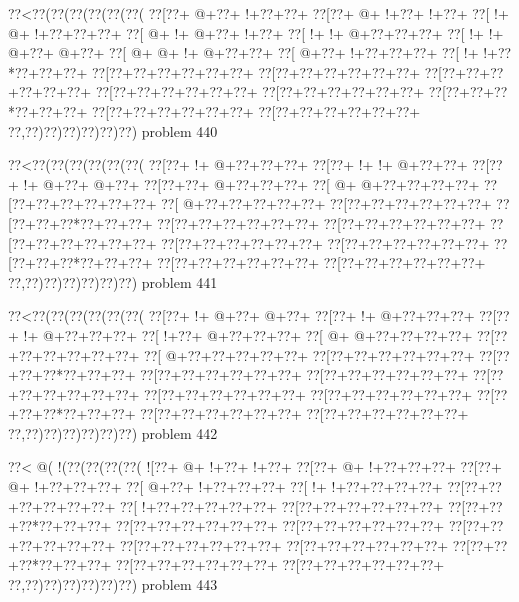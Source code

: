 \vbox{\vbox{\goo
\0??<\0??(\0??(\0??(\0??(\0??(\0??(
\0??[\0??+\- @+\0??+\- !+\0??+\0??+
\0??[\0??+\- @+\- !+\0??+\- !+\0??+
\0??[\- !+\- @+\- !+\0??+\0??+\0??+
\0??[\- @+\- !+\- @+\0??+\- !+\0??+
\0??[\- !+\- !+\- @+\0??+\0??+\0??+
\0??[\- !+\- !+\- @+\0??+\- @+\0??+
\0??[\- @+\- @+\- !+\- @+\0??+\0??+
\0??[\- @+\0??+\- !+\0??+\0??+\0??+
\0??[\- !+\- !+\0??*\0??+\0??+\0??+
\0??[\0??+\0??+\0??+\0??+\0??+\0??+
\0??[\0??+\0??+\0??+\0??+\0??+\0??+
\0??[\0??+\0??+\0??+\0??+\0??+\0??+
\0??[\0??+\0??+\0??+\0??+\0??+\0??+
\0??[\0??+\0??+\0??+\0??+\0??+\0??+
\0??[\0??+\0??+\0??*\0??+\0??+\0??+
\0??[\0??+\0??+\0??+\0??+\0??+\0??+
\0??[\0??+\0??+\0??+\0??+\0??+\0??+
\0??,\0??)\0??)\0??)\0??)\0??)\0??)
}
\hfil problem 440\hfil\break
}

\vbox{\vbox{\goo
\0??<\0??(\0??(\0??(\0??(\0??(\0??(
\0??[\0??+\- !+\- @+\0??+\0??+\0??+
\0??[\0??+\- !+\- !+\- @+\0??+\0??+
\0??[\0??+\- !+\- @+\0??+\- @+\0??+
\0??[\0??+\0??+\- @+\0??+\0??+\0??+
\0??[\- @+\- @+\0??+\0??+\0??+\0??+
\0??[\0??+\0??+\0??+\0??+\0??+\0??+
\0??[\- @+\0??+\0??+\0??+\0??+\0??+
\0??[\0??+\0??+\0??+\0??+\0??+\0??+
\0??[\0??+\0??+\0??*\0??+\0??+\0??+
\0??[\0??+\0??+\0??+\0??+\0??+\0??+
\0??[\0??+\0??+\0??+\0??+\0??+\0??+
\0??[\0??+\0??+\0??+\0??+\0??+\0??+
\0??[\0??+\0??+\0??+\0??+\0??+\0??+
\0??[\0??+\0??+\0??+\0??+\0??+\0??+
\0??[\0??+\0??+\0??*\0??+\0??+\0??+
\0??[\0??+\0??+\0??+\0??+\0??+\0??+
\0??[\0??+\0??+\0??+\0??+\0??+\0??+
\0??,\0??)\0??)\0??)\0??)\0??)\0??)
}
\hfil problem 441\hfil\break
}

\vbox{\vbox{\goo
\0??<\0??(\0??(\0??(\0??(\0??(\0??(
\0??[\0??+\- !+\- @+\0??+\- @+\0??+
\0??[\0??+\- !+\- @+\0??+\0??+\0??+
\0??[\0??+\- !+\- @+\0??+\0??+\0??+
\0??[\- !+\0??+\- @+\0??+\0??+\0??+
\0??[\- @+\- @+\0??+\0??+\0??+\0??+
\0??[\0??+\0??+\0??+\0??+\0??+\0??+
\0??[\- @+\0??+\0??+\0??+\0??+\0??+
\0??[\0??+\0??+\0??+\0??+\0??+\0??+
\0??[\0??+\0??+\0??*\0??+\0??+\0??+
\0??[\0??+\0??+\0??+\0??+\0??+\0??+
\0??[\0??+\0??+\0??+\0??+\0??+\0??+
\0??[\0??+\0??+\0??+\0??+\0??+\0??+
\0??[\0??+\0??+\0??+\0??+\0??+\0??+
\0??[\0??+\0??+\0??+\0??+\0??+\0??+
\0??[\0??+\0??+\0??*\0??+\0??+\0??+
\0??[\0??+\0??+\0??+\0??+\0??+\0??+
\0??[\0??+\0??+\0??+\0??+\0??+\0??+
\0??,\0??)\0??)\0??)\0??)\0??)\0??)
}
\hfil problem 442\hfil\break
}

\vbox{\vbox{\goo
\0??<\- @(\- !(\0??(\0??(\0??(\0??(
\- ![\0??+\- @+\- !+\0??+\- !+\0??+
\0??[\0??+\- @+\- !+\0??+\0??+\0??+
\0??[\0??+\- @+\- !+\0??+\0??+\0??+
\0??[\- @+\0??+\- !+\0??+\0??+\0??+
\0??[\- !+\- !+\0??+\0??+\0??+\0??+
\0??[\0??+\0??+\0??+\0??+\0??+\0??+
\0??[\- !+\0??+\0??+\0??+\0??+\0??+
\0??[\0??+\0??+\0??+\0??+\0??+\0??+
\0??[\0??+\0??+\0??*\0??+\0??+\0??+
\0??[\0??+\0??+\0??+\0??+\0??+\0??+
\0??[\0??+\0??+\0??+\0??+\0??+\0??+
\0??[\0??+\0??+\0??+\0??+\0??+\0??+
\0??[\0??+\0??+\0??+\0??+\0??+\0??+
\0??[\0??+\0??+\0??+\0??+\0??+\0??+
\0??[\0??+\0??+\0??*\0??+\0??+\0??+
\0??[\0??+\0??+\0??+\0??+\0??+\0??+
\0??[\0??+\0??+\0??+\0??+\0??+\0??+
\0??,\0??)\0??)\0??)\0??)\0??)\0??)
}
\hfil problem 443\hfil\break
}

